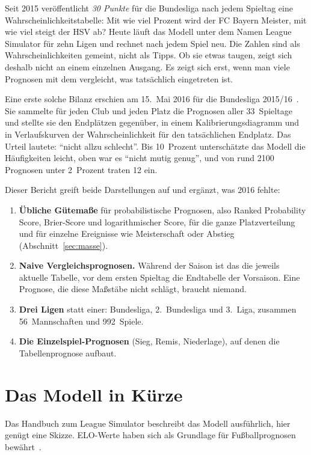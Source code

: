 \documentclass[11pt,a4paper,parskip=half,numbers=noenddot]{scrartcl}
\begin{document}
Seit 2015 veröffentlicht \emph{30 Punkte} für die Bundesliga nach jedem
Spieltag eine Wahrscheinlichkeitstabelle: Mit wie viel Prozent wird der FC
Bayern Meister, mit wie viel steigt der HSV ab? Heute läuft das Modell unter
dem Namen League Simulator für zehn Ligen und rechnet nach jedem Spiel neu.
Die Zahlen sind als Wahrscheinlichkeiten gemeint, nicht als Tipps. Ob sie
etwas taugen, zeigt sich deshalb nicht an einem einzelnen Ausgang. Es zeigt
sich erst, wenn man viele Prognosen mit dem vergleicht, was tatsächlich
eingetreten ist.

Eine erste solche Bilanz erschien am 15.~Mai 2016 für die Bundesliga
2015/16~\cite{30punkte2016}. Sie sammelte für jeden Club und jeden Platz die
Prognosen aller 33~Spieltage und stellte sie den Endplätzen gegenüber, in
einem Kalibrierungsdiagramm und in Verlaufskurven der Wahrscheinlichkeit für
den tatsächlichen Endplatz. Das Urteil lautete: \enquote{nicht allzu
schlecht}. Bis 10~Prozent unterschätzte das Modell die Häufigkeiten leicht,
oben war es \enquote{nicht mutig genug}, und von rund \num{2100} Prognosen
unter 2~Prozent traten 12 ein.

Dieser Bericht greift beide Darstellungen auf und ergänzt, was 2016 fehlte:
\begin{enumerate}
  \item \textbf{Übliche Gütemaße} für probabilistische Prognosen, also
        Ranked Probability Score, Brier-Score und logarithmischer Score, für
        die ganze Platzverteilung und für einzelne Ereignisse wie Meisterschaft
        oder Abstieg (Abschnitt~\ref{sec:masse}).
  \item \textbf{Naive Vergleichsprognosen.} Während der Saison ist das die
        jeweils aktuelle Tabelle, vor dem ersten Spieltag die Endtabelle der
        Vorsaison. Eine Prognose, die diese Maßstäbe nicht schlägt, braucht
        niemand.
  \item \textbf{Drei Ligen} statt einer: Bundesliga, 2.~Bundesliga und
        3.~Liga, zusammen 56~Mannschaften und 992~Spiele.
  \item \textbf{Die Einzelspiel-Prognosen} (Sieg, Remis, Niederlage), auf
        denen die Tabellenprognose aufbaut.
\end{enumerate}

\section{Das Modell in Kürze}\label{sec:modell}

Das Handbuch zum League Simulator beschreibt das Modell ausführlich, hier
genügt eine Skizze. ELO-Werte haben sich als Grundlage für
Fußballprognosen bewährt~\cite{hvattum2010}.
\end{document}
